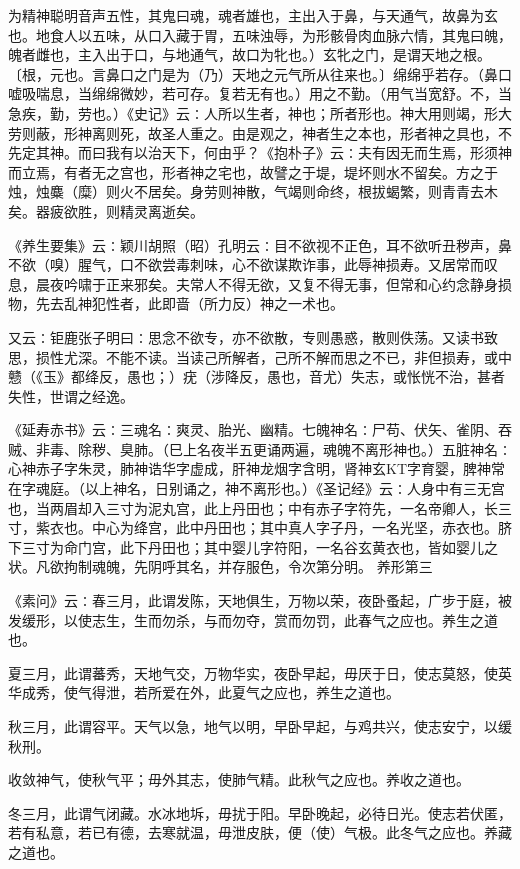 \documentclass[a4paper,12pt,UTF8,twoside]{ctexbook}
\begin{document}
为精神聪明音声五性，其鬼曰魂，魂者雄也，主出入于鼻，与天通气，故鼻为玄也。地食人以五味，从口入藏于胃，五味浊辱，为形骸骨肉血脉六情，其鬼曰魄，魄者雌也，主入出于口，与地通气，故口为牝也。）玄牝之门，是谓天地之根。〔根，元也。言鼻口之门是为（乃）天地之元气所从往来也。〕绵绵乎若存。（鼻口嘘吸喘息，当绵绵微妙，若可存。复若无有也。）用之不勤。（用气当宽舒。不，当急疾，勤，劳也。）《史记》云∶人所以生者，神也；所者形也。神大用则竭，形大劳则蔽，形神离则死，故圣人重之。由是观之，神者生之本也，形者神之具也，不先定其神。而曰我有以治天下，何由乎？《抱朴子》云∶夫有因无而生焉，形须神而立焉，有者无之宫也，形者神之宅也，故譬之于堤，堤坏则水不留矣。方之于烛，烛麋（糜）则火不居矣。身劳则神散，气竭则命终，根拔蝎繁，则青青去木矣。器疲欲胜，则精灵离逝矣。

《养生要集》云∶颖川胡照（昭）孔明云∶目不欲视不正色，耳不欲听丑秽声，鼻不欲（嗅）腥气，口不欲尝毒刺味，心不欲谋欺诈事，此辱神损寿。又居常而叹息，晨夜吟啸于正来邪矣。夫常人不得无欲，又复不得无事，但常和心约念静身损物，先去乱神犯性者，此即啬（所力反）神之一术也。

又云∶钜鹿张子明曰∶思念不欲专，亦不欲散，专则愚惑，散则佚荡。又读书致思，损性尤深。不能不读。当读己所解者，己所不解而思之不已，非但损寿，或中戆（《玉》都绛反，愚也；）疣（涉降反，愚也，音尤）失志，或怅恍不治，甚者失性，世谓之经逸。

《延寿赤书》云∶三魂名∶爽灵、胎光、幽精。七魄神名∶尸苟、伏矢、雀阴、吞贼、非毒、除秽、臭肺。（巳上名夜半五更诵两遍，魂魄不离形神也。）五脏神名∶心神赤子字朱灵，肺神诰华字虚成，肝神龙烟字含明，肾神玄KT字育婴，脾神常在字魂庭。（以上神名，日别诵之，神不离形也。）《圣记经》云∶人身中有三无宫也，当两眉却入三寸为泥丸宫，此上丹田也；中有赤子字符先，一名帝卿人，长三寸，紫衣也。中心为绛宫，此中丹田也；其中真人字子丹，一名光坚，赤衣也。脐下三寸为命门宫，此下丹田也；其中婴儿字符阳，一名谷玄黄衣也，皆如婴儿之状。凡欲拘制魂魄，先阴呼其名，并存服色，令次第分明。
养形第三

《素问》云∶春三月，此谓发陈，天地俱生，万物以荣，夜卧蚤起，广步于庭，被发缓形，以使志生，生而勿杀，与而勿夺，赏而勿罚，此春气之应也。养生之道也。

夏三月，此谓蕃秀，天地气交，万物华实，夜卧早起，毋厌于日，使志莫怒，使英华成秀，使气得泄，若所爱在外，此夏气之应也，养生之道也。

秋三月，此谓容平。天气以急，地气以明，早卧早起，与鸡共兴，使志安宁，以缓秋刑。

收敛神气，使秋气平；毋外其志，使肺气精。此秋气之应也。养收之道也。

冬三月，此谓气闭藏。水冰地坼，毋扰于阳。早卧晚起，必待日光。使志若伏匿，若有私意，若已有德，去寒就温，毋泄皮肤，便（使）气极。此冬气之应也。养藏之道也。
\end{document}
